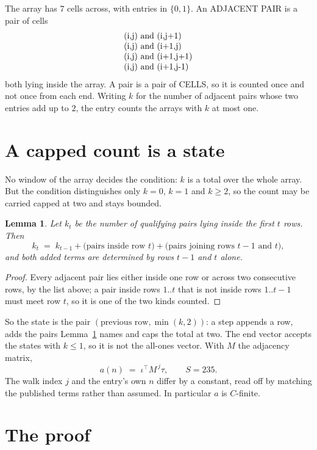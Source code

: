 \documentclass[11pt,a4paper]{article}
\theoremstyle{plain}
\newtheorem{lemma}[theorem]{Lemma}
\theoremstyle{definition}
\begin{document}
The array has $7$ cells across, with entries in $\{0,1\}$. An ADJACENT PAIR is a pair of cells
\[
\begin{array}{l}
$(i,j)\text{ and }(i,j{+}1)$ \\
$(i,j)\text{ and }(i{+}1,j)$ \\
$(i,j)\text{ and }(i{+}1,j{+}1)$ \\
$(i,j)\text{ and }(i{+}1,j{-}1)$ \\
\end{array}
\]
both lying inside the array. A pair is a pair of CELLS, so it is counted once and not once from
each end. Writing $k$ for the number of adjacent pairs whose two entries add up to $2$, the
entry counts the arrays with $k$ at most one.

\section{A capped count is a state}

No window of the array decides the condition: $k$ is a total over the whole array. But the
condition distinguishes only $k=0$, $k=1$ and $k\ge2$, so the count may be carried capped at
two and stays bounded.

\begin{lemma}\label{lem:cap}
Let $k_t$ be the number of qualifying pairs lying inside the first $t$ rows. Then
\[
k_{t}\;=\;k_{t-1}+\bigl(\text{pairs inside row } t\bigr)
+\bigl(\text{pairs joining rows } t-1 \text{ and } t\bigr),
\]
and both added terms are determined by rows $t-1$ and $t$ alone.
\end{lemma}

\begin{proof}
Every adjacent pair lies either inside one row or across two consecutive rows, by the list
above; a pair inside rows $1..t$ that is not inside rows $1..t-1$ must meet row $t$, so it is
one of the two kinds counted.
\end{proof}

So the state is the pair $(\text{previous row},\min(k,2))$: a step appends a row, adds the
pairs Lemma~\ref{lem:cap} names and caps the total at two. The end vector accepts the states
with $k\le1$, so it is not the all-ones vector. With $M$ the adjacency matrix,
\[
a(n)\;=\;\iota^{\!\top}M^{\,j}\tau ,\qquad S=235.
\]
The walk index $j$ and the entry's own $n$ differ by a constant, read off by matching the
published terms rather than assumed. In particular $a$ is $C$-finite.

\section{The proof}
\end{document}
